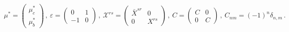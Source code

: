 \begin{equation}
\mu ^{\ast }=\left( 
\begin{array}{c}
\mu _{c}^{\ast } \\ 
\mu _{b}^{\ast }
\end{array}
\right) \,,~\varepsilon =\left( 
\begin{array}{cc}
0 & 1 \\ 
-1 & 0
\end{array}
\right) \,,~\mathcal{X}^{rs}=\left( 
\begin{array}{cc}
\bar{X}^{sr} & 0 \\ 
0 & X^{rs}
\end{array}
\right) \,,~C=\left( 
\begin{array}{cc}
C & 0 \\ 
0 & C
\end{array}
\right) \,,~C_{nm}=(-1)^{n}\delta _{n,m}\,.
\end{equation}

